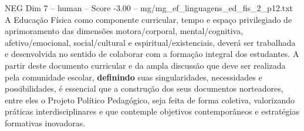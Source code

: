 \begin{textsample}{NEG Dim 7 – human – Score -3.00 – mg/mg\_ef\_linguagens\_ed\_fis\_2\_p12.txt}  \label{ex:f7_neg_002}
A Educação Física como componente curricular, tempo e espaço privilegiado de aprimoramento das dimensões motora/corporal, mental/cognitiva, afetivo/emocional, social/cultural e espiritual/existenciais, deverá ser trabalhada e desenvolvida no sentido de colaborar com a formação integral dos estudantes.
A partir deste documento curricular e da ampla discussão que deve ser realizada pela comunidade escolar, \textbf{definindo} suas singularidades, necessidades e possibilidades, é essencial que a construção dos seus documentos norteadores, entre eles o Projeto Político Pedagógico, seja feita de forma coletiva, valorizando práticas interdisciplinares e que contemple objetivos contemporâneos e estratégias formativas inovadoras.

\end{textsample}
